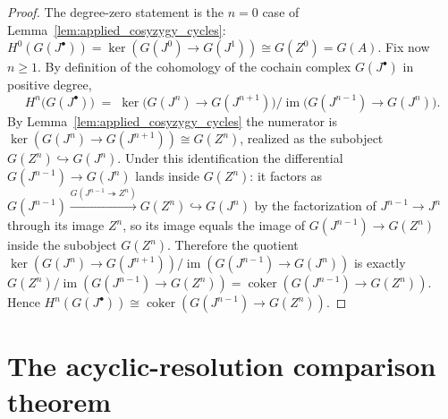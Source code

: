 \begin{proof}
  The degree-zero statement is the \(n = 0\) case of
  Lemma~\ref{lem:applied_cosyzygy_cycles}: \(H^0(G(J^\bullet)) = \ker(G(J^0) \to G(J^1))
  \cong G(Z^0) = G(A)\). Fix now \(n \geq 1\). By definition of the cohomology of the
  cochain complex \(G(J^\bullet)\) in positive degree,
  \[
    H^n\bigl(G(J^\bullet)\bigr)
      \;=\; \ker\bigl(G(J^n) \to G(J^{n+1})\bigr) \big/
            \operatorname{im}\bigl(G(J^{n-1}) \to G(J^n)\bigr).
  \]
  By Lemma~\ref{lem:applied_cosyzygy_cycles} the numerator is
  \(\ker(G(J^n) \to G(J^{n+1})) \cong G(Z^n)\), realized as the subobject
  \(G(Z^n) \hookrightarrow G(J^n)\). Under this identification the differential
  \(G(J^{n-1}) \to G(J^n)\) lands inside \(G(Z^n)\): it factors as
  \(G(J^{n-1}) \xrightarrow{G(J^{n-1} \twoheadrightarrow Z^n)} G(Z^n)
  \hookrightarrow G(J^n)\) by the factorization of \(J^{n-1} \to J^n\) through its image
  \(Z^n\), so its image equals the image of \(G(J^{n-1}) \to G(Z^n)\) inside the
  subobject \(G(Z^n)\). Therefore the quotient
  \(\ker(G(J^n) \to G(J^{n+1})) / \operatorname{im}(G(J^{n-1}) \to G(J^n))\) is exactly
  \(G(Z^n) / \operatorname{im}(G(J^{n-1}) \to G(Z^n)) =
  \operatorname{coker}(G(J^{n-1}) \to G(Z^n))\). Hence
  \(H^n(G(J^\bullet)) \cong \operatorname{coker}(G(J^{n-1}) \to G(Z^n))\).
\end{proof}

\section{The acyclic-resolution comparison theorem}

